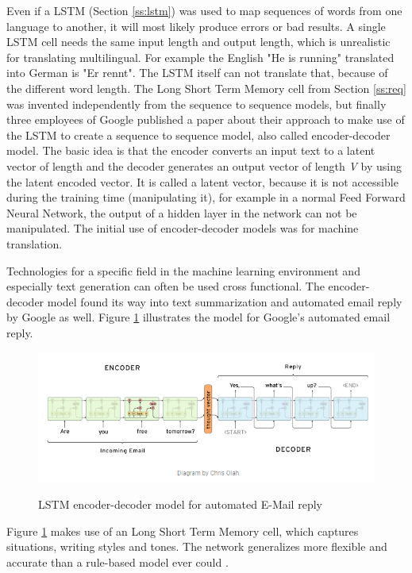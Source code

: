 Even if a LSTM (Section \ref{ss:lstm}) was used to map sequences of words from one language to another, it will most likely produce errors or bad results. A single LSTM cell needs the same input length and output length, which is unrealistic for translating multilingual. For example the English "He is running" translated into German is "Er rennt". The LSTM itself can not translate that, because of the different word length. 
The Long Short Term Memory cell from Section \ref{ss:req} was invented independently from the sequence to sequence models, but
finally three employees of Google published a paper about their approach to make use of the LSTM to create a sequence to sequence model, also called encoder-decoder model.
The basic idea is that the encoder converts an input text to a latent vector of length  and the decoder generates an output vector of length \textit{V} by using the latent encoded vector. It is called a latent vector, because it is not accessible during the training time (manipulating it), for example in a normal Feed Forward Neural Network, the output of a hidden layer in the network can not be manipulated. The initial use of encoder-decoder models was for machine translation.

Technologies for a specific field in the machine learning environment and especially text generation can often be used cross functional. The encoder-decoder model found its way into text summarization and automated email reply by Google \cite{google} as well. Figure \ref{enc-dec} illustrates the model for Google's automated email reply.

\begin{figure}
	\begin{center}
		\includegraphics[width=5.5in]{photos/encoder_decoder}\\
		\caption{LSTM encoder-decoder model for automated E-Mail reply}\label{enc-dec}
	\end{center}
\end{figure}

Figure \ref{enc-dec} makes use of an Long Short Term Memory cell, which captures situations, writing styles and tones. The network generalizes more flexible and accurate than a rule-based model ever could \cite{google}. 


